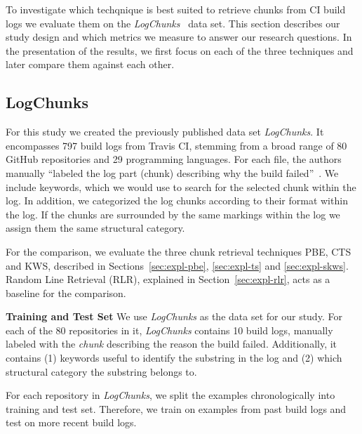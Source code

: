 To investigate which techqnique is best suited to retrieve chunks from
CI build logs we evaluate them on the
\emph{LogChunks}~\cite{brandt2020logchunks} data set. This section
describes our study design and which metrics we measure to answer our
research questions. In the presentation of the results, we first focus
on each of the three techniques and later compare them against each
other.

\subsection{LogChunks}
For this study we created the previously published data set
\emph{LogChunks}. It encompasses 797 build logs from Travis CI,
stemming from a broad range of 80 GitHub repositories and 29
programming languages. For each file, the authors manually ``labeled
the log part (chunk) describing why the build
failed''~\cite{brandt2020logchunks}. We include keywords, which we
would use to search for the selected chunk within the log. In
addition, we categorized the log chunks according to their format
within the log. If the chunks are surrounded by the same markings
within the log we assign them the same structural category.

For the comparison, we evaluate the three chunk retrieval techniques
PBE, CTS and KWS, described in Sections~\ref{sec:expl-pbe},
\ref{sec:expl-ts} and \ref{sec:expl-skws}. Random Line Retrieval
(RLR), explained in Section~\ref{sec:expl-rlr}, acts as a baseline for
the comparison.

\noindent
\textbf{Training and Test Set}
We use \emph{LogChunks} as the data set for our study. For each of the
80 repositories in it, \emph{LogChunks} contains 10 build logs,
manually labeled with the \emph{chunk} describing the
reason the build failed. Additionally, it contains (1) keywords useful
to identify the substring in the log  and (2) which structural category
the substring belongs to.

For each repository in \emph{LogChunks}, we split the examples
chronologically into training and test set. Therefore, we train on
examples from past build logs and test on more recent build logs.

